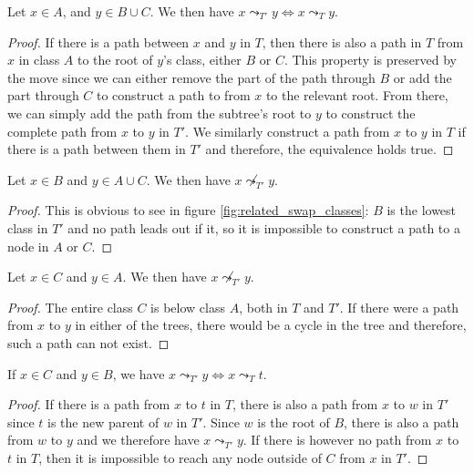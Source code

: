 \begin{lemma}
    \label{lem:related_swap_abc}
    Let $x \in A$, and $y \in B \cup C$. We then have $x \leadsto_{T'} y \Leftrightarrow x \leadsto_T y$.
\end{lemma}

\begin{proof}
    If there is a path between $x$ and $y$ in $T$, then there is also a path in $T$ from $x$ in class $A$ to the root of $y$'s class, either $B$ or $C$. This property is preserved by the move since we can either remove the part of the path through $B$ or add the part through $C$ to construct a path to from $x$ to the relevant root. From there, we can simply add the path from the subtree's root to $y$ to construct the complete path from $x$ to $y$ in $T'$. We similarly construct a path from $x$ to $y$ in $T$ if there is a path between them in $T'$ and therefore, the equivalence holds true.
\end{proof}

\begin{lemma}
    \label{lem:related_swap_bac}
    Let $x \in B$ and $y \in A \cup C$. We then have $x \not\leadsto_{T'} y$.
\end{lemma}

\begin{proof}
    This is obvious to see in figure \ref{fig:related_swap_classes}: $B$ is the lowest class in $T'$ and no path leads out if it, so it is impossible to construct a path to a node in $A$ or $C$.
\end{proof}

\begin{lemma}
    \label{lem:related_swap_ca}
    Let $x \in C$ and $y \in A$. We then have $x \not\leadsto_{T'} y$.
\end{lemma}

\begin{proof}
    The entire class $C$ is below class $A$, both in $T$ and $T'$. If there were a path from $x$ to $y$ in either of the trees, there would be a cycle in the tree and therefore, such a path can not exist.
\end{proof}

\begin{lemma}
    \label{lem:related_swap_cb}
    If $x \in C$ and $y \in B$, we have $x \leadsto_{T'} y \Leftrightarrow x \leadsto_T t$.
\end{lemma}

\begin{proof}
    If there is a path from $x$ to $t$ in $T$, there is also a path from $x$ to $w$ in $T'$ since $t$ is the new parent of $w$ in $T'$. Since $w$ is the root of $B$, there is also a path from $w$ to $y$ and we therefore have $x \leadsto_{T'} y$. If there is however no path from $x$ to $t$ in $T$, then it is impossible to reach any node outside of $C$ from $x$ in $T'$.
\end{proof}

